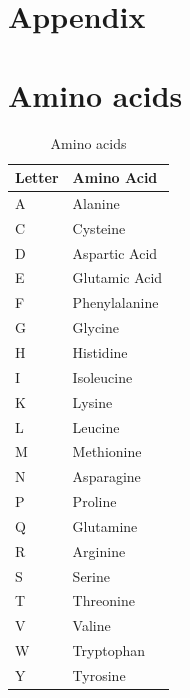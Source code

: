 \section{Appendix}

\section*{Amino acids}
\begin{table}[h]
\caption{Amino acids}
\centering
\begin{tabular}{l|l}
Letter	& Amino Acid	\\ \hline
A		& Alanine		\\
C		& Cysteine		\\
D		& Aspartic Acid	\\
E		& Glutamic Acid	\\
F		& Phenylalanine	\\
G		& Glycine		\\
H		& Histidine		\\
I		& Isoleucine	\\
K		& Lysine		\\
L		& Leucine		\\
M		& Methionine	\\
N		& Asparagine	\\
P		& Proline		\\
Q		& Glutamine		\\
R		& Arginine		\\
S		& Serine		\\
T		& Threonine		\\
V		& Valine		\\
W		& Tryptophan	\\
Y		& Tyrosine		\\

\end{tabular}
\end{table}

\newpage
